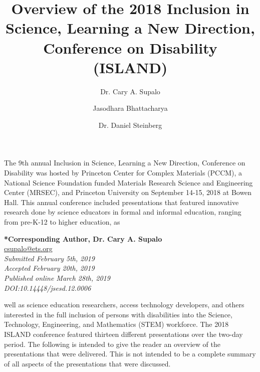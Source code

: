 \documentclass[11.5pt]{sig-alternate} %
\begin{document}
\title{Overview of the 2018 Inclusion in Science, Learning a New Direction, Conference on Disability (ISLAND)}

\author[1]{\large \color{blue}Dr. Cary A. Supalo}
\author[1]{\large \color{blue}Jasodhara Bhattacharya}
\author[1]{\large \color{blue}Dr. Daniel Steinberg}


\toappear{}
\maketitle %
\begin{large}
The 9th annual Inclusion in Science, Learning a New Direction, Conference on Disability was hosted by Princeton Center for Complex Materials (PCCM), a National Science Foundation funded Materials Research Science and Engineering Center (MRSEC), and Princeton University on September 14-15, 2018 at Bowen Hall. This annual conference included presentations that featured innovative research done by science educators in formal and informal education, ranging from pre-K-12 to higher education, as

\end{large}
 
\textbf{*Corresponding Author, Dr. Cary A. Supalo}\\
\href{mailto:csupalo@ets.org}{csupalo@ets.org} \\
\textit{Submitted  February 5th, 2019}\\
\textit{Accepted February 20th, 2019} \\
\textit{Published online March 28th, 2019} \\
\textit{DOI:10.14448/jsesd.12.0006} \\
\newpage
\begin{large}
well as science education researchers, access technology developers, and others interested in the full inclusion of persons with disabilities into the Science, Technology, Engineering, and Mathematics (STEM) workforce. The 2018 ISLAND conference featured thirteen different presentations over the two-day period. The following is intended to give the reader an overview of the presentations that were delivered. This is not intended to be a complete summary of all aspects of the presentations that were discussed.

\end{large}
\end{document}
